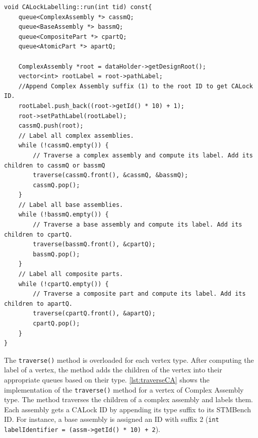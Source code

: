 \begin{lstlisting}[caption={BFS traversal for CALock labelling}, label={lst:labelling-algo}]
void CALockLabelling::run(int tid) const{
    queue<ComplexAssembly *> cassmQ;
    queue<BaseAssembly *> bassmQ;
    queue<CompositePart *> cpartQ;
    queue<AtomicPart *> apartQ;

    ComplexAssembly *root = dataHolder->getDesignRoot();
    vector<int> rootLabel = root->pathLabel;
    //Append Complex Assembly suffix (1) to the root ID to get CALock ID.
    rootLabel.push_back((root->getId() * 10) + 1);
    root->setPathLabel(rootLabel);
    cassmQ.push(root);
    // Label all complex assemblies.
    while (!cassmQ.empty()) {
        // Traverse a complex assembly and compute its label. Add its children to cassmQ or bassmQ
        traverse(cassmQ.front(), &cassmQ, &bassmQ);
        cassmQ.pop();
    }
    // Label all base assemblies.
    while (!bassmQ.empty()) {
        // Traverse a base assembly and compute its label. Add its children to cpartQ.
        traverse(bassmQ.front(), &cpartQ);
        bassmQ.pop();
    }
    // Label all composite parts.
    while (!cpartQ.empty()) {
        // Traverse a composite part and compute its label. Add its children to apartQ.
        traverse(cpartQ.front(), &apartQ);
        cpartQ.pop();
    }
}
\end{lstlisting}

The \texttt{traverse()} method is overloaded for each vertex type. After computing the label of a vertex, the method adds the children of the vertex into their appropriate queues based on their type. \cref{lst:traverseCA} shows the implementation of the \texttt{traverse()} method for a vertex of Complex Assembly type. The method traverses the children of a complex assembly and labels them. Each assembly gets a CALock ID by appending its type suffix to its STMBench ID. For instance, a base assembly is assigned an ID with suffix 2 (\texttt{int labelIdentifier = (assm->getId() * 10) + 2}).

